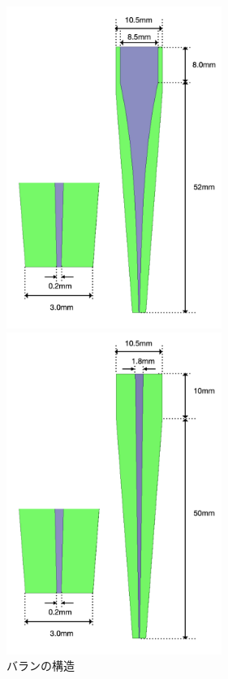 \documentclass[11pt,a4paper,uplatex]{ujarticle}
\begin{document}
  \begin{figure}[tbp]
    \centering
    \begin{minipage}[b]{0.495\textwidth}
      \centering
      \includegraphics[keepaspectratio, width=70mm]{Images/taper_balun_top.png}
    \end{minipage}
    \begin{minipage}[b]{0.495\textwidth}
      \centering
      \includegraphics[keepaspectratio, width=70mm]{Images/taper_balun_bottom.png}
    \end{minipage}
    \caption{バランの構造}\label{fig:taper_balun_configuration}
  \end{figure}
\end{document}
